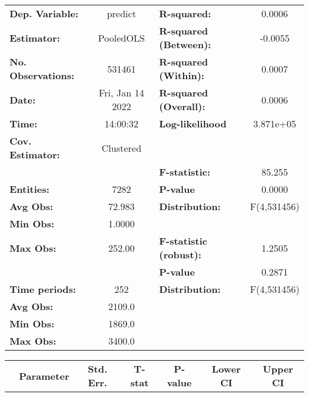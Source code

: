 \begin{center}
\begin{tabular}{lclc}
\toprule
\textbf{Dep. Variable:}    &      predict       & \textbf{  R-squared:         }   &      0.0006      \\
\textbf{Estimator:}        &     PooledOLS      & \textbf{  R-squared (Between):}  &     -0.0055      \\
\textbf{No. Observations:} &       531461       & \textbf{  R-squared (Within):}   &      0.0007      \\
\textbf{Date:}             &  Fri, Jan 14 2022  & \textbf{  R-squared (Overall):}  &      0.0006      \\
\textbf{Time:}             &      14:00:32      & \textbf{  Log-likelihood     }   &    3.871e+05     \\
\textbf{Cov. Estimator:}   &     Clustered      & \textbf{                     }   &                  \\
\textbf{}                  &                    & \textbf{  F-statistic:       }   &      85.255      \\
\textbf{Entities:}         &        7282        & \textbf{  P-value            }   &      0.0000      \\
\textbf{Avg Obs:}          &       72.983       & \textbf{  Distribution:      }   &   F(4,531456)    \\
\textbf{Min Obs:}          &       1.0000       & \textbf{                     }   &                  \\
\textbf{Max Obs:}          &       252.00       & \textbf{  F-statistic (robust):} &      1.2505      \\
\textbf{}                  &                    & \textbf{  P-value            }   &      0.2871      \\
\textbf{Time periods:}     &        252         & \textbf{  Distribution:      }   &   F(4,531456)    \\
\textbf{Avg Obs:}          &       2109.0       & \textbf{                     }   &                  \\
\textbf{Min Obs:}          &       1869.0       & \textbf{                     }   &                  \\
\textbf{Max Obs:}          &       3400.0       & \textbf{                     }   &                  \\
\bottomrule
\end{tabular}
\begin{tabular}{lcccccc}
                & \textbf{Parameter} & \textbf{Std. Err.} & \textbf{T-stat} & \textbf{P-value} & \textbf{Lower CI} & \textbf{Upper CI}  \\

\end{tabular}
\end{center}
